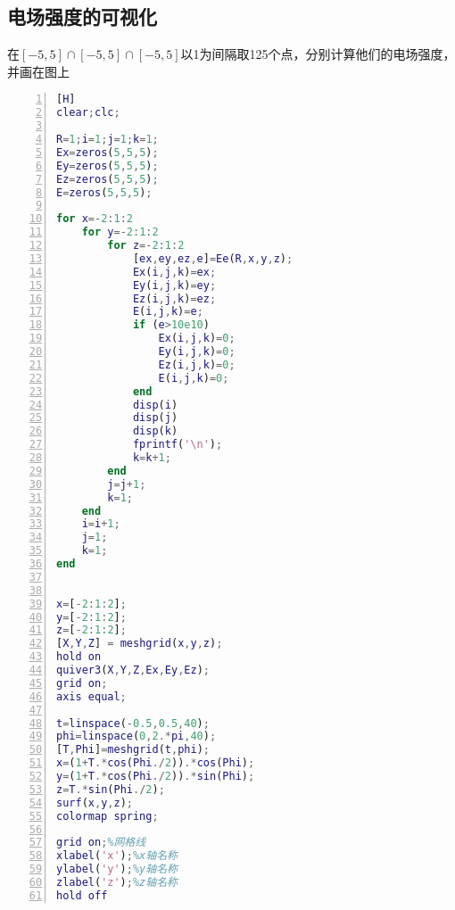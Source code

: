 \subsection{电场强度的可视化}
在$\left[-5,5\right]\cap\left[-5,5\right]\cap\left[-5,5\right]$以1为间隔取125个点，分别计算他们的电场强度，并画在图上
\begin{lstlisting}[language={Matlab},
  numbers=left,
  numberstyle=\tiny\menlo,
  basicstyle=\small\menlo][H]
clear;clc;

R=1;i=1;j=1;k=1;
Ex=zeros(5,5,5);
Ey=zeros(5,5,5);
Ez=zeros(5,5,5);
E=zeros(5,5,5);

for x=-2:1:2
    for y=-2:1:2
        for z=-2:1:2
            [ex,ey,ez,e]=Ee(R,x,y,z);
            Ex(i,j,k)=ex;
            Ey(i,j,k)=ey;
            Ez(i,j,k)=ez;
            E(i,j,k)=e;
            if (e>10e10)
                Ex(i,j,k)=0;
                Ey(i,j,k)=0;
                Ez(i,j,k)=0;
                E(i,j,k)=0;
            end
            disp(i)
            disp(j)
            disp(k)
            fprintf('\n');
            k=k+1;
        end
        j=j+1;
        k=1;
    end
    i=i+1;
    j=1;
    k=1;
end


x=[-2:1:2];
y=[-2:1:2];
z=[-2:1:2];
[X,Y,Z] = meshgrid(x,y,z);
hold on
quiver3(X,Y,Z,Ex,Ey,Ez);
grid on;
axis equal;

t=linspace(-0.5,0.5,40);
phi=linspace(0,2.*pi,40);
[T,Phi]=meshgrid(t,phi);
x=(1+T.*cos(Phi./2)).*cos(Phi);
y=(1+T.*cos(Phi./2)).*sin(Phi);
z=T.*sin(Phi./2);
surf(x,y,z);
colormap spring;

grid on;%网格线
xlabel('x');%x轴名称
ylabel('y');%y轴名称
zlabel('z');%z轴名称
hold off
\end{lstlisting}

